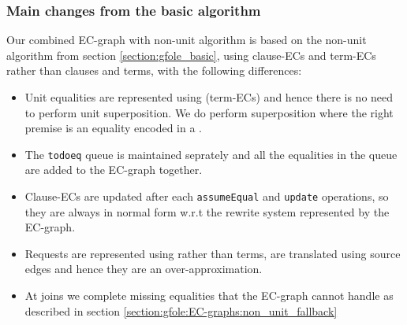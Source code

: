 \bigskip 

\subsubsection*{Main changes from the basic algorithm}
Our combined EC-graph with non-unit algorithm is based on the non-unit algorithm from section \ref{section:gfole_basic}, using clause-ECs and term-ECs rather than clauses and terms, with the following differences:
\begin{itemize}
	\item Unit equalities are represented using \GTs{} (term-ECs) and hence there is no need to perform unit superposition. 
	We do perform superposition where the right premise is an equality encoded in a \GT{}.
	\item The \lstinline|todoeq| queue is maintained seprately and all the equalities in the queue are added to the EC-graph together.
	\item Clause-ECs are updated after each \lstinline|assumeEqual| and \lstinline|update| operations, so they are always in normal form w.r.t the rewrite system represented by the EC-graph.
	\item Requests are represented using \GFAs{} rather than terms, are translated using source edges and hence they are an over-approximation.
	\item At joins we complete missing equalities that the EC-graph cannot handle as described in section \ref{section:gfole:EC-graphs:non_unit_fallback}
\end{itemize}
